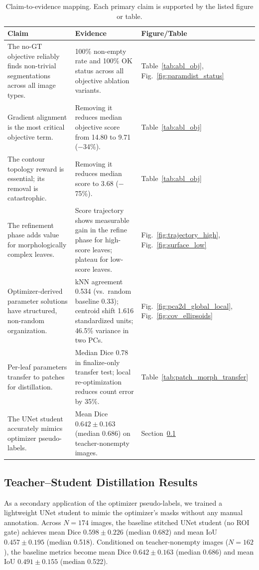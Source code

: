 \documentclass[journal]{IEEEtran}
\begin{document}
\begin{table}[t]
\centering
\caption{Claim-to-evidence mapping. Each primary claim is supported by the listed figure or table.}
\label{tab:claim_evidence}
\begin{tabular}{p{} p{} p{}}
\toprule
\textbf{Claim} & \textbf{Evidence} & \textbf{Figure/Table} \\
\midrule
The no-GT objective reliably finds non-trivial segmentations across all image types. & 100\% non-empty rate and 100\% OK status across all objective ablation variants. & Table~\ref{tab:abl_obj}, Fig.~\ref{fig:paramdist_status} \\
\midrule
Gradient alignment is the most critical objective term. & Removing it reduces median objective score from 14.80 to 9.71 ($-$34\%). & Table~\ref{tab:abl_obj} \\
\midrule
The contour topology reward is essential; its removal is catastrophic. & Removing it reduces median score to 3.68 ($-$75\%). & Table~\ref{tab:abl_obj} \\
\midrule
The refinement phase adds value for morphologically complex leaves. & Score trajectory shows measurable gain in the refine phase for high-score leaves; plateau for low-score leaves. & Fig.~\ref{fig:trajectory_high}, Fig.~\ref{fig:surface_low} \\
\midrule
Optimizer-derived parameter solutions have structured, non-random organization. & kNN agreement 0.534 (vs.\ random baseline 0.33); centroid shift 1.616 standardized units; 46.5\% variance in two PCs. & Fig.~\ref{fig:pca2d_global_local}, Fig.~\ref{fig:cov_ellipsoids} \\
\midrule
Per-leaf parameters transfer to patches for distillation. & Median Dice 0.78 in finalize-only transfer test; local re-optimization reduces count error by 35\%. & Table~\ref{tab:patch_morph_transfer} \\
\midrule
The UNet student accurately mimics optimizer pseudo-labels. & Mean Dice $0.642\pm0.163$ (median 0.686) on teacher-nonempty images. & Section~\ref{sec:distillation_results} \\
\bottomrule
\end{tabular}
\end{table}

\subsection{Teacher--Student Distillation Results}
\label{sec:distillation_results}
As a secondary application of the optimizer pseudo-labels, we trained a lightweight UNet student to mimic the optimizer's masks without any manual annotation. Across $N=174$ images, the baseline stitched UNet student (no ROI gate) achieves mean Dice $0.598\pm0.226$ (median 0.682) and mean IoU $0.457\pm0.195$ (median 0.518). Conditioned on teacher-nonempty images ($N=162$), the baseline metrics become mean Dice $0.642\pm0.163$ (median 0.686) and mean IoU $0.491\pm0.155$ (median 0.522).
\end{document}
